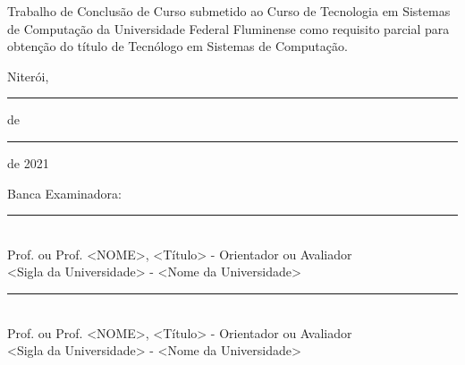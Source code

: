 \noindent
\begin{flushright}
\begin{minipage}[t]{8cm}

  Trabalho de Conclus\~ao de Curso submetido ao Curso de Tecnologia em Sistemas de Computa\c{c}\~ao da Universidade Federal Fluminense como requisito parcial para obten\c{c}\~ao do t\'itulo de Tecn\'ologo em Sistemas de Computa\c{c}\~ao. %

\end{minipage}
\end{flushright}
\vspace{1.0 cm}
\begin{center}
  Niter\'oi, \rule{1cm}{.3mm} de \rule{4cm}{.3mm} de 2021 \\ 
\end{center}
Banca Examinadora:
\begin{center}
\rule{11cm}{.3mm} \\
  Prof. ou Prof\textordfeminine. <NOME>, <T\'{i}tulo> - Orientador ou Avaliador \\
  <Sigla da Universidade> - <Nome da Universidade>\\
  \vspace{10mm}
\rule{11cm}{.3mm} \\
  Prof. ou Prof\textordfeminine. <NOME>, <T\'{i}tulo> - Orientador ou Avaliador \\
  <Sigla da Universidade> - <Nome da Universidade>\\
  \vspace{6mm}
\vspace{6mm}
\end{center}



